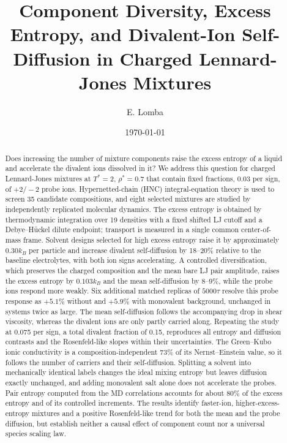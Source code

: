 \documentclass[aps,pre,twocolumn,superscriptaddress,floatfix]{revtex4-2}
\begin{document}
\title{Component Diversity, Excess Entropy, and Divalent-Ion Self-Diffusion in Charged Lennard-Jones Mixtures}

\author{E. Lomba}

\date{\today}

\begin{abstract}
Does increasing the number of mixture components raise the excess entropy of a liquid and accelerate the divalent ions dissolved in it? We address this question for charged Lennard-Jones mixtures at $T^*=2$, $\rho^*=0.7$ that contain fixed fractions, 0.03 per sign, of $+2/-2$ probe ions. Hypernetted-chain (HNC) integral-equation theory is used to screen 35 candidate compositions, and eight selected mixtures are studied by independently replicated molecular dynamics. The excess entropy is obtained by thermodynamic integration over 19 densities with a fixed shifted LJ cutoff and a Debye--H\"uckel dilute endpoint; transport is measured in a single common center-of-mass frame. Solvent designs selected for high excess entropy raise it by approximately $0.30k_B$ per particle and increase divalent self-diffusion by 18--20\% relative to the baseline electrolytes, with both ion signs accelerating. A controlled diversification, which preserves the charged composition and the mean bare LJ pair amplitude, raises the excess entropy by $0.103k_B$ and the mean self-diffusion by 8--9\%, while the probe ions respond more weakly. Six additional matched replicas of $5000\tau$ resolve this probe response as $+5.1\%$ without and $+5.9\%$ with monovalent background, unchanged in systems twice as large. The mean self-diffusion follows the accompanying drop in shear viscosity, whereas the divalent ions are only partly carried along. Repeating the study at 0.075 per sign, a total divalent fraction of 0.15, reproduces all entropy and diffusion contrasts and the Rosenfeld-like slopes within their uncertainties. The Green--Kubo ionic conductivity is a composition-independent 73\% of its Nernst--Einstein value, so it follows the number of carriers and their self-diffusion. Splitting a solvent into mechanically identical labels changes the ideal mixing entropy but leaves diffusion exactly unchanged, and adding monovalent salt alone does not accelerate the probes. Pair entropy computed from the MD correlations accounts for about 80\% of the excess entropy and of its controlled increments. The results identify faster-ion, higher-excess-entropy mixtures and a positive Rosenfeld-like trend for both the mean and the probe diffusion, but establish neither a causal effect of component count nor a universal species scaling law.
\end{abstract}
\maketitle
\end{document}
